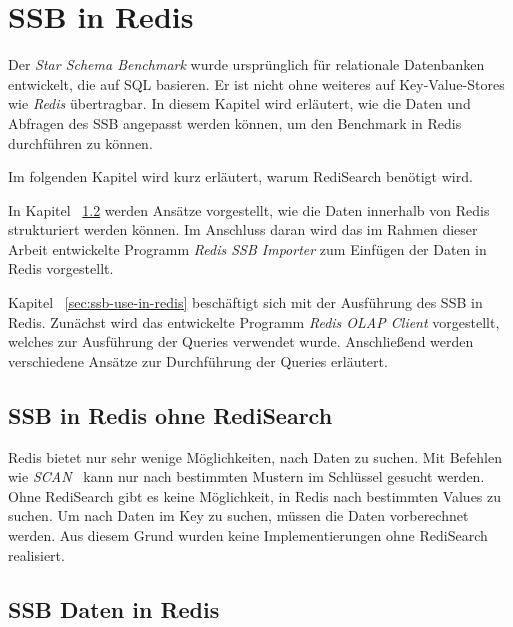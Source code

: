 \chapter{SSB in Redis}
Der \emph{Star Schema Benchmark} wurde ursprünglich für relationale Datenbanken entwickelt, die auf SQL basieren. Er ist nicht ohne weiteres auf Key-Value-Stores wie \emph{Redis} übertragbar. In diesem Kapitel wird erläutert, wie die Daten und Abfragen des SSB angepasst werden können, um den Benchmark in Redis durchführen zu können.

Im folgenden Kapitel wird kurz erläutert, warum RediSearch benötigt wird.

In Kapitel ~\ref{sec:ssb-data-in-redis} werden Ansätze vorgestellt, wie die Daten innerhalb von Redis strukturiert werden können. Im Anschluss daran wird das im Rahmen dieser Arbeit entwickelte Programm \emph{Redis SSB Importer} zum Einfügen der Daten in Redis vorgestellt.


Kapitel ~\ref{sec:ssb-use-in-redis} beschäftigt sich mit der Ausführung des SSB in Redis.
Zunächst wird das entwickelte Programm \emph{Redis OLAP Client} vorgestellt, welches zur Ausführung der Queries verwendet wurde. Anschließend werden verschiedene Ansätze zur Durchführung der Queries erläutert. %

\section{SSB in Redis ohne RediSearch}
Redis bietet nur sehr wenige Möglichkeiten, nach Daten zu suchen. Mit Befehlen wie \emph{SCAN}~\cite{redis_ltd_scan_nodate} kann nur nach bestimmten Mustern im Schlüssel gesucht werden. Ohne RediSearch gibt es keine Möglichkeit, in Redis nach bestimmten Values zu suchen. Um nach Daten im Key zu suchen, müssen die Daten vorberechnet werden. Aus diesem Grund wurden keine Implementierungen ohne RediSearch realisiert.

\section{SSB Daten in Redis}\label{sec:ssb-data-in-redis}


